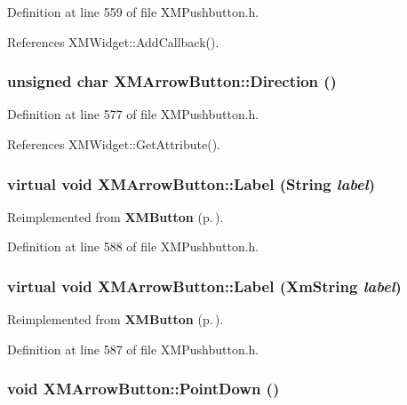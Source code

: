 Definition at line 559 of file XMPushbutton.h.

References XMWidget::Add\-Callback().
\subsubsection{\setlength{\rightskip}{0pt plus 5cm}unsigned char XMArrow\-Button::Direction ()\hspace{0.3cm}{\tt  [inline]}}\label{classXMArrowButton_a7}




Definition at line 577 of file XMPushbutton.h.

References XMWidget::Get\-Attribute().
\subsubsection{\setlength{\rightskip}{0pt plus 5cm}virtual void XMArrow\-Button::Label (String {\em label})\hspace{0.3cm}{\tt  [inline, virtual]}}\label{classXMArrowButton_a9}




Reimplemented from {\bf XMButton} {\rm (p.\,\pageref{classXMButton_a3})}.

Definition at line 588 of file XMPushbutton.h.
\subsubsection{\setlength{\rightskip}{0pt plus 5cm}virtual void XMArrow\-Button::Label (Xm\-String {\em label})\hspace{0.3cm}{\tt  [inline, virtual]}}\label{classXMArrowButton_a8}




Reimplemented from {\bf XMButton} {\rm (p.\,\pageref{classXMButton_a2})}.

Definition at line 587 of file XMPushbutton.h.
\subsubsection{\setlength{\rightskip}{0pt plus 5cm}void XMArrow\-Button::Point\-Down ()\hspace{0.3cm}{\tt  [inline]}}\label{classXMArrowButton_a6}




